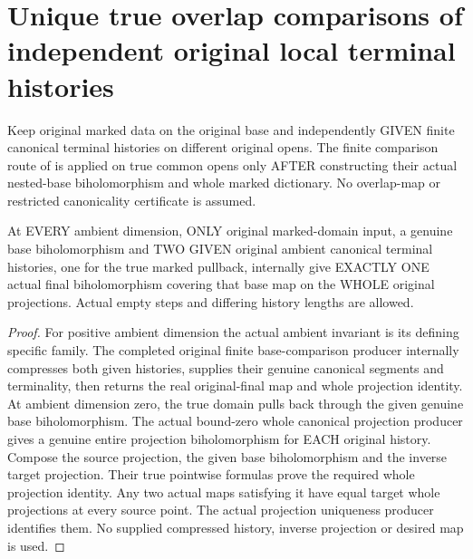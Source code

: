 \section{Unique true overlap comparisons of independent original local terminal histories}

Keep original marked data on the original base and independently GIVEN
finite canonical terminal histories on different original opens. The
finite comparison route of
\cite{wlodarczyk05-hironaka,bierstone-milman08-functoriality} is applied
on true common opens only AFTER constructing their actual nested-base
biholomorphism and whole marked dictionary. No overlap-map or restricted
canonicality certificate is assumed.

\begin{theorem}
\label{hir:original-ambient-terminal-base-biholomorphism-unique-comparison}
\leanok
At EVERY ambient dimension, ONLY original marked-domain input, a genuine
base biholomorphism and TWO GIVEN original ambient canonical terminal
histories, one for the true marked pullback, internally give EXACTLY ONE
actual final biholomorphism covering that base map on the WHOLE original
projections. Actual empty steps and differing history lengths are allowed.
\end{theorem}
\begin{proof}
For positive ambient dimension the actual ambient invariant is its defining
specific family. The completed original finite base-comparison producer
internally compresses both given histories, supplies their genuine canonical
segments and terminality, then returns the real original-final map and whole
projection identity. At ambient dimension zero, the true domain pulls back
through the given genuine base biholomorphism. The actual bound-zero whole
canonical projection producer gives a genuine entire projection
biholomorphism for EACH original history. Compose the source projection,
the given base biholomorphism and the inverse target projection. Their true
pointwise formulas prove the required whole projection identity. Any two
actual maps satisfying it have equal target whole projections at every
source point. The actual projection uniqueness producer identifies them.
No supplied compressed history, inverse projection or desired map is used.
\end{proof}

